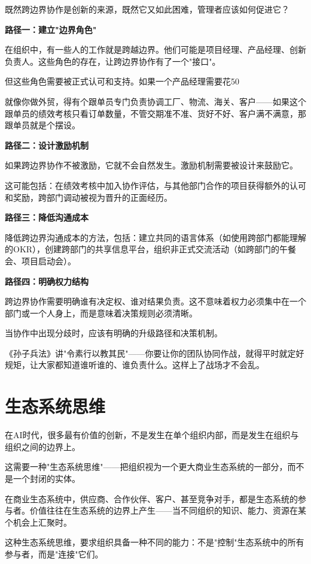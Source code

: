 既然跨边界协作是创新的来源，既然它又如此困难，管理者应该如何促进它？

\textbf{路径一：建立"边界角色"}

在组织中，有一些人的工作就是跨越边界。他们可能是项目经理、产品经理、创新负责人。这些角色的存在，让跨边界协作有了一个"接口"。

但这些角色需要被正式认可和支持。如果一个产品经理需要花50%

就像你做外贸，得有个跟单员专门负责协调工厂、物流、海关、客户——如果这个跟单员的绩效考核只看订单数量，不管交期准不准、货好不好、客户满不满意，那跟单员就是个摆设。

\textbf{路径二：设计激励机制}

如果跨边界协作不被激励，它就不会自然发生。激励机制需要被设计来鼓励它。

这可能包括：在绩效考核中加入协作评估，与其他部门合作的项目获得额外的认可和奖励，跨部门调动被视为晋升的正面经历。

\textbf{路径三：降低沟通成本}

降低跨边界沟通成本的方法，包括：建立共同的语言体系（如使用跨部门都能理解的OKR），创建跨部门的共享信息平台，组织非正式交流活动（如跨部门的午餐会、项目启动会）。

\textbf{路径四：明确权力结构}

跨边界协作需要明确谁有决定权、谁对结果负责。这不意味着权力必须集中在一个部门或一个人身上，而是意味着决策规则必须清晰。

当协作中出现分歧时，应该有明确的升级路径和决策机制。

《孙子兵法》讲"令素行以教其民"——你要让你的团队协同作战，就得平时就定好规矩，让大家都知道谁听谁的、谁负责什么。这样上了战场才不会乱。

\section{生态系统思维}


在AI时代，很多最有价值的创新，不是发生在单个组织内部，而是发生在组织与组织之间的边界上。

这需要一种"生态系统思维"——把组织视为一个更大商业生态系统的一部分，而不是一个封闭的实体。

在商业生态系统中，供应商、合作伙伴、客户、甚至竞争对手，都是生态系统的参与者。价值往往在生态系统的边界上产生——当不同组织的知识、能力、资源在某个机会上汇聚时。

这种生态系统思维，要求组织具备一种不同的能力：不是"控制"生态系统中的所有参与者，而是"连接"它们。

